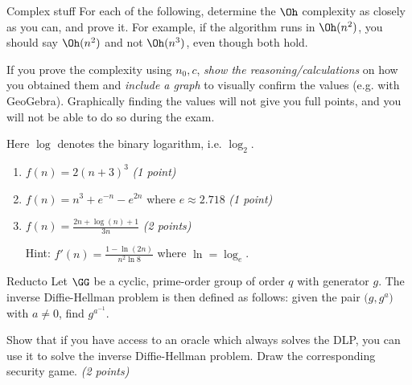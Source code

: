 \documentclass{homework}
\begin{document}
\begin{task}{Complex stuff}
  For each of the following, determine the $\Oh$ complexity as closely as you can, and prove it.
  For example, if the algorithm runs in $\Oh(n^2)$, you should say $\Oh(n^2)$ and not $\Oh(n^3)$, even though both hold.

  If you prove the complexity using $n_0, c$, \emph{show the reasoning/calculations} on how you obtained them and \emph{include a graph} to visually confirm the values (e.g. with GeoGebra).
  Graphically finding the values will not give you full points, and you will not be able to do so during the exam.

  Here $\log$ denotes the binary logarithm, i.e. $\log_2$.

  \begin{enumerate}
    \item $f(n) = 2(n + 3)^3$ \textit{(1 point)}
    \item $f(n) = n^3 + e^{-n} - e^{2n}$ where $e \approx 2.718$ \textit{(1 point)}
    \item $f(n) = \frac{2n + \log(n) + 1}{3n}$ \textit{(2 points)}
    
    Hint: $f'(n) = \frac{1 - \ln(2n)}{n^2 \ln8}$ where $\ln = \log_e$.
  \end{enumerate}
\end{task}

\begin{task}{Reducto}
  Let $\GG$ be a cyclic, prime-order group of order $q$ with generator $g$.
  The inverse Diffie-Hellman problem is then defined as follows: given the pair $\bigl(g, g^a\bigr)$ with $a \neq 0$, find $g^{a^{-1}}$.

  Show that if you have access to an oracle which always solves the DLP, you can use it to solve the inverse Diffie-Hellman problem.
  Draw the corresponding security game.
  \textit{(2 points)}
\end{task}

\newpage
\end{document}
